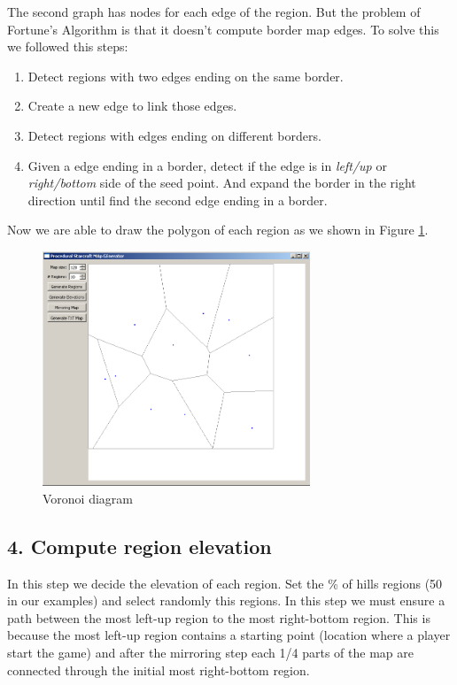 \documentclass[letterpaper]{article}
\begin{document}
The second graph has nodes for each edge of the region. But the problem of Fortune's Algorithm is that it doesn't compute border map edges. To solve this we followed this steps:
\begin{enumerate}
	\item Detect regions with two edges ending on the same border.
	\item Create a new edge to link those edges.
	\item Detect regions with edges ending on different borders.
	\item Given a edge ending in a border, detect if the edge is in \emph{left/up} or \emph{right/bottom} side of the seed point. And expand the border in the right direction until find the second edge ending in a border.
\end{enumerate}
Now we are able to draw the polygon of each region as we shown in Figure \ref{fig:voronoi-diagram}.

\begin{figure}[ht]
    \centering
    \includegraphics[width=8cm]{PCG02.png}
    \caption{Voronoi diagram}
    \label{fig:voronoi-diagram}
\end{figure}

\subsection{4. Compute region elevation}
In this step we decide the elevation of each region. Set the \% of hills regions (50 in our examples) and select randomly this regions. In this step we must ensure a path between the most left-up region to the most right-bottom region. This is because the most left-up region contains a starting point (location where a player start the game) and after the mirroring step each 1/4 parts of the map are connected through the initial most right-bottom region.
\end{document}

